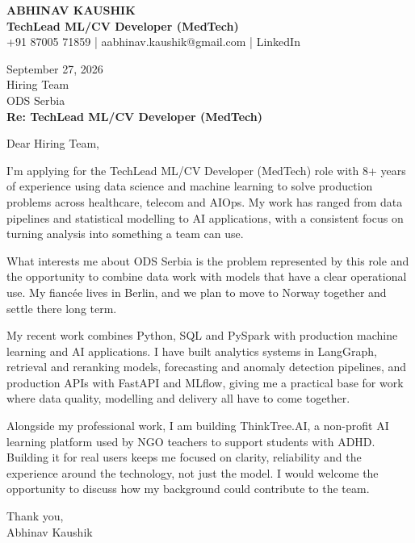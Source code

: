 \documentclass[10pt,a4paper]{article}
\begin{document}
\begin{center}
{\Large\bfseries ABHINAV KAUSHIK}\\[2pt]
{\bfseries TechLead ML/CV Developer (MedTech)}\\[2pt]
+91 87005 71859 \quad | \quad aabhinav.kaushik@gmail.com \quad | \quad LinkedIn
\end{center}
\vspace{8pt}
September 27, 2026\\[6pt]
Hiring Team\\
ODS Serbia\\[4pt]
\textbf{Re: TechLead ML/CV Developer (MedTech)}

Dear Hiring Team,

I’m applying for the TechLead ML/CV Developer (MedTech) role with 8+ years of experience using data science and machine learning to solve production problems across healthcare, telecom and AIOps. My work has ranged from data pipelines and statistical modelling to AI applications, with a consistent focus on turning analysis into something a team can use.

What interests me about ODS Serbia is the problem represented by this role and the opportunity to combine data work with models that have a clear operational use. My fiancée lives in Berlin, and we plan to move to Norway together and settle there long term.

My recent work combines Python, SQL and PySpark with production machine learning and AI applications. I have built analytics systems in LangGraph, retrieval and reranking models, forecasting and anomaly detection pipelines, and production APIs with FastAPI and MLflow, giving me a practical base for work where data quality, modelling and delivery all have to come together.

Alongside my professional work, I am building ThinkTree.AI, a non-profit AI learning platform used by NGO teachers to support students with ADHD. Building it for real users keeps me focused on clarity, reliability and the experience around the technology, not just the model. I would welcome the opportunity to discuss how my background could contribute to the team.

Thank you,\\
Abhinav Kaushik
\end{document}
